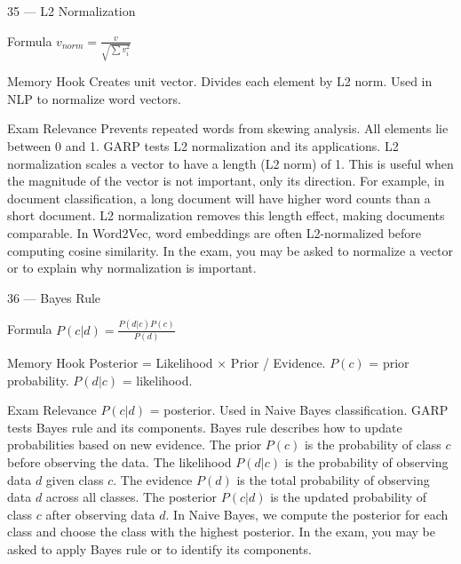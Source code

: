 \documentclass[aspectratio=169,8pt]{beamer}
\begin{document}
	\begin{frame}{35 --- L2 Normalization}
		\begin{block}{Formula}
			$v_{norm} = \frac{v}{\sqrt{\sum v_i^2}}$
		\end{block}
		\begin{block}{Memory Hook}
			Creates unit vector. Divides each element by L2 norm. Used in NLP to normalize word vectors.
		\end{block}
		\begin{block}{Exam Relevance}
			Prevents repeated words from skewing analysis. All elements lie between 0 and 1. GARP tests L2 normalization and its applications. L2 normalization scales a vector to have a length (L2 norm) of 1. This is useful when the magnitude of the vector is not important, only its direction. For example, in document classification, a long document will have higher word counts than a short document. L2 normalization removes this length effect, making documents comparable. In Word2Vec, word embeddings are often L2-normalized before computing cosine similarity. In the exam, you may be asked to normalize a vector or to explain why normalization is important.
		\end{block}
	\end{frame}
	
	\begin{frame}{36 --- Bayes Rule}
		\begin{block}{Formula}
			$P(c|d) = \frac{P(d|c)P(c)}{P(d)}$
		\end{block}
		\begin{block}{Memory Hook}
			Posterior = Likelihood $\times$ Prior / Evidence. $P(c)$ = prior probability. $P(d|c)$ = likelihood.
		\end{block}
		\begin{block}{Exam Relevance}
			$P(c|d)$ = posterior. Used in Naive Bayes classification. GARP tests Bayes rule and its components. Bayes rule describes how to update probabilities based on new evidence. The prior $P(c)$ is the probability of class $c$ before observing the data. The likelihood $P(d|c)$ is the probability of observing data $d$ given class $c$. The evidence $P(d)$ is the total probability of observing data $d$ across all classes. The posterior $P(c|d)$ is the updated probability of class $c$ after observing data $d$. In Naive Bayes, we compute the posterior for each class and choose the class with the highest posterior. In the exam, you may be asked to apply Bayes rule or to identify its components.
		\end{block}
	\end{frame}
	
\end{document}
